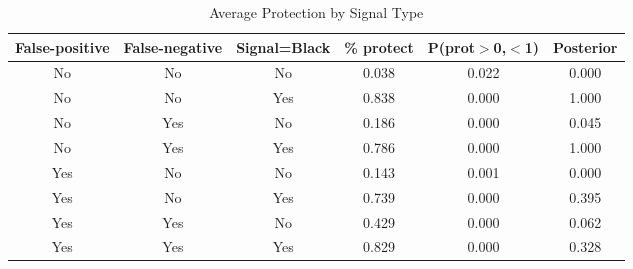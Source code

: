 \begin{table}[H]\centering \caption{Average Protection by Signal Type} \begin{tabular}{cccccc} \hline \hline
\textbf{False-positive}&\textbf{False-negative}&\textbf{Signal=Black}&\textbf{\% protect}& \textbf{P(prot$>$0,$<$1)}& \textbf{Posterior} \\ \hline
No&No&No&0.038&0.022&0.000\\
No&No&Yes&0.838&0.000&1.000\\
No&Yes&No&0.186&0.000&0.045\\
No&Yes&Yes&0.786&0.000&1.000\\
Yes&No&No&0.143&0.001&0.000\\
Yes&No&Yes&0.739&0.000&0.395\\
Yes&Yes&No&0.429&0.000&0.062\\
Yes&Yes&Yes&0.829&0.000&0.328\\
\hline \end{tabular} \end{table}

